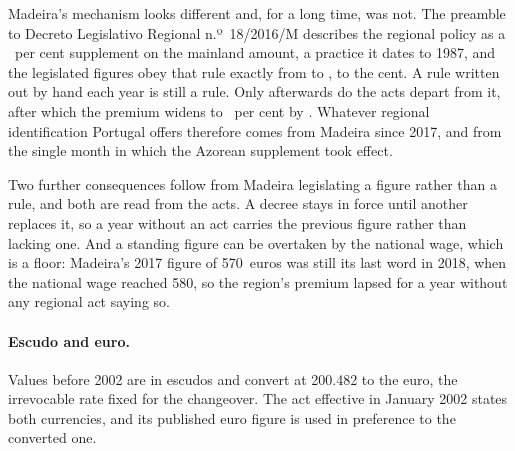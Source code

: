 Madeira's mechanism looks different and, for a long time, was not. The preamble
to Decreto Legislativo Regional n.º~18/2016/M describes the regional policy as a
\MadeiraRuleFactorPct{}~per cent supplement on the mainland amount, a practice
it dates to 1987, and the legislated figures obey that rule exactly from
\MadeiraRuleFirstYear{} to \MadeiraRuleLastYear{}, to the cent. A rule written
out by hand each year is still a rule. Only afterwards do the acts depart from
it, after which the premium widens to \MadeiraPremiumEndPct{}~per cent by
\MadeiraPremiumEndYear{}. Whatever regional identification Portugal
offers therefore comes from Madeira since 2017, and from the single month in
which the Azorean supplement took effect.

Two further consequences follow from Madeira legislating a figure rather than a
rule, and both are read from the acts. A decree stays in force until another
replaces it, so a year without an act carries the previous figure rather than
lacking one. And a standing figure can be overtaken by the national wage, which
is a floor: Madeira's 2017 figure of 570~euros was still its last word in 2018,
when the national wage reached 580, so the region's premium lapsed for a year
without any regional act saying so.

\paragraph{Escudo and euro.} Values before 2002 are in escudos and convert at
200.482 to the euro, the irrevocable rate fixed for the changeover. The act
effective in January 2002 states both currencies, and its published euro figure
is used in preference to the converted one.
